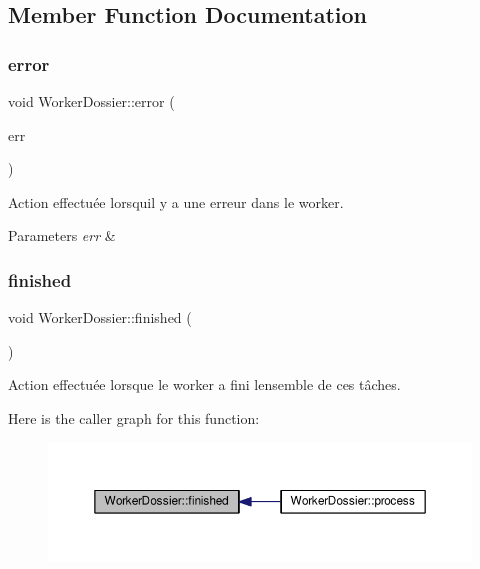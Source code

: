 \subsection{Member Function Documentation}
\mbox{\label{classWorkerDossier_afb02d04b47bb81450661cbc36ad25902}} 
\subsubsection{\texorpdfstring{error}{error}}
{\footnotesize\ttfamily void Worker\+Dossier\+::error (\begin{DoxyParamCaption}\item[{Q\+String}]{err }\end{DoxyParamCaption})\hspace{0.3cm}{\ttfamily [signal]}}



Action effectuée lorsqu\textquotesingle{}il y a une erreur dans le worker. 


\begin{DoxyParams}{Parameters}
{\em err} & \\
\hline
\end{DoxyParams}
\mbox{\label{classWorkerDossier_aef696bfd03c464295dc80fb1fc9f71da}} 
\subsubsection{\texorpdfstring{finished}{finished}}
{\footnotesize\ttfamily void Worker\+Dossier\+::finished (\begin{DoxyParamCaption}{ }\end{DoxyParamCaption})\hspace{0.3cm}{\ttfamily [signal]}}



Action effectuée lorsque le worker a fini l\textquotesingle{}ensemble de ces tâches. 

Here is the caller graph for this function\+:\nopagebreak
\begin{figure}[H]
\begin{center}
\leavevmode
\includegraphics[width=350pt]{classWorkerDossier_aef696bfd03c464295dc80fb1fc9f71da_icgraph}
\end{center}
\end{figure}
\mbox{\label{classWorkerDossier_a2e2970df6c43c669eb730a858a780a31}} 
